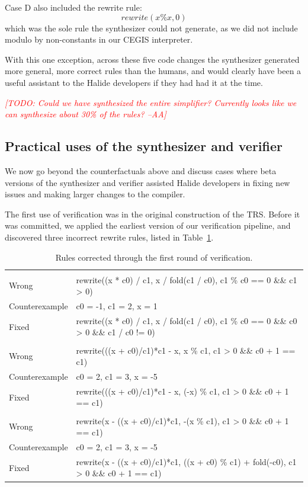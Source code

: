 \documentclass[acmsmall,review,anonymous]{acmart}\settopmatter{printfolios=true,printccs=false,printacmref=false}
\newcommand{\aba}[1]{\textcolor{red}{\textit{[{#1} --AA]}}}
\begin{document}
Case D also included the rewrite rule: 
\[
rewrite(x \% x, 0)
\]
which was the sole rule the synthesizer could not generate, as we did not include modulo by non-constants in our CEGIS interpreter.

With this one exception, across these five code changes the synthesizer generated more general, more correct rules than the humans, and would clearly have been a useful assistant to the Halide developers if they had had it at the time.

\aba{TODO: Could we have synthesized the entire simplifier? Currently looks like we can synthesize about 30\% of the rules?
}

\subsection{Practical uses of the synthesizer and verifier}

We now go beyond the counterfactuals above and discuss cases where beta versions of the synthesizer and verifier assisted Halide developers in fixing new issues and making larger changes to the compiler. 

The first use of verification was in the original construction of the TRS. Before it was committed, we applied the earliest version of our verification pipeline, and discovered three incorrect rewrite rules, listed in Table~\ref{tab:verfirstround}.

\begin{table}
\caption{Rules corrected through the first round of verification.}
\begin{tabular}{|l|l|}
\hline \\
Wrong &  rewrite((x * c0) / c1, x / fold(c1 / c0), c1 \% c0 == 0 \&\& c1 > 0) \\
Counterexample & c0 = -1, c1 = 2, x = 1\\
Fixed & rewrite((x * c0) / c1, x / fold(c1 / c0), c1 \% c0 == 0 \&\& c0 > 0 \&\& c1 / c0 != 0)\\
\hline \\
Wrong & rewrite(((x + c0)/c1)*c1 - x, x \% c1, c1 > 0 \&\& c0 + 1 == c1)\\
Counterexample & c0 = 2, c1 = 3, x = -5\\
Fixed &  rewrite(((x + c0)/c1)*c1 - x, (-x) \% c1, c1 > 0 \&\& c0 + 1 == c1)\\
\hline \\
Wrong & rewrite(x - ((x + c0)/c1)*c1, -(x \% c1), c1 > 0 \&\& c0 + 1 == c1)\\
Counterexample & c0 = 2, c1 = 3, x = -5\\
Fixed & rewrite(x - ((x + c0)/c1)*c1, ((x + c0) \% c1) + fold(-c0), c1 > 0 \&\& c0 + 1 == c1) \\
\hline
\end{tabular}
\label{tab:verfirstround}
\end{table}
\end{document}
